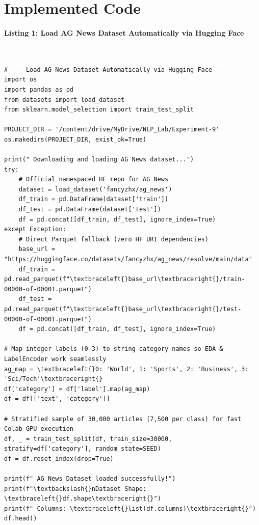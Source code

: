 \documentclass[12pt,a4paper,oneside]{report}
\begin{document}
\section{Implemented Code}
\paragraph{Listing 1: Load AG News Dataset Automatically via Hugging Face}\mbox{}\\[-1ex]
\begin{Verbatim}[commandchars=\\\{\},breaklines=true,breakanywhere=true,fontsize=\scriptsize,frame=leftline,framesep=2mm,rulecolor=\color{gray}]
# --- Load AG News Dataset Automatically via Hugging Face ---
import os
import pandas as pd
from datasets import load_dataset
from sklearn.model_selection import train_test_split

PROJECT_DIR = '/content/drive/MyDrive/NLP_Lab/Experiment-9'
os.makedirs(PROJECT_DIR, exist_ok=True)

print(" Downloading and loading AG News dataset...")
try:
    # Official namespaced HF repo for AG News
    dataset = load_dataset('fancyzhx/ag_news')
    df_train = pd.DataFrame(dataset['train'])
    df_test = pd.DataFrame(dataset['test'])
    df = pd.concat([df_train, df_test], ignore_index=True)
except Exception:
    # Direct Parquet fallback (zero HF URI dependencies)
    base_url = "https://huggingface.co/datasets/fancyzhx/ag_news/resolve/main/data"
    df_train = pd.read_parquet(f"\textbraceleft{}base_url\textbraceright{}/train-00000-of-00001.parquet")
    df_test = pd.read_parquet(f"\textbraceleft{}base_url\textbraceright{}/test-00000-of-00001.parquet")
    df = pd.concat([df_train, df_test], ignore_index=True)

# Map integer labels (0-3) to string category names so EDA & LabelEncoder work seamlessly
ag_map = \textbraceleft{}0: 'World', 1: 'Sports', 2: 'Business', 3: 'Sci/Tech'\textbraceright{}
df['category'] = df['label'].map(ag_map)
df = df[['text', 'category']]

# Stratified sample of 30,000 articles (7,500 per class) for fast Colab GPU execution
df, _ = train_test_split(df, train_size=30000, stratify=df['category'], random_state=SEED)
df = df.reset_index(drop=True)

print(f" AG News Dataset loaded successfully!")
print(f"\textbackslash{}nDataset Shape: \textbraceleft{}df.shape\textbraceright{}")
print(f" Columns: \textbraceleft{}list(df.columns)\textbraceright{}")
df.head()
\end{Verbatim}
\end{document}
